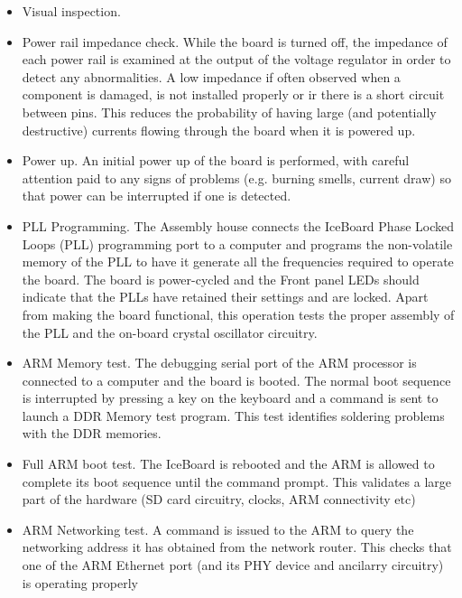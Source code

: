 \documentclass[11pt,article]{memoir}
\begin{document}
\begin{itemize}
	\item Visual inspection.

	\item Power rail impedance check. While the board is turned off, the impedance of
	each power rail is examined at the output of the voltage regulator in order to
	detect any abnormalities. A low impedance if often observed when a component
	is damaged, is not installed properly or ir there is a short circuit between
	pins. This reduces the probability of having large (and potentially
	destructive) currents flowing through the board when it is powered up.

	\item Power up. An initial power up of the board is performed, with careful
	attention paid to any signs of problems (e.g. burning smells, current draw) so
	that power can be interrupted if one is detected.

	\item PLL Programming. The Assembly house connects the IceBoard Phase Locked
	Loops (PLL) programming port to a computer and programs the non-volatile
	memory of the PLL to have it generate all the frequencies required to operate
	the board. The board is power-cycled and the Front panel LEDs should indicate
	that the PLLs have retained their settings and are locked. Apart from making
	the board functional, this operation tests the proper assembly of the PLL and
	the on-board crystal oscillator circuitry.

	\item ARM Memory test. The debugging serial port of the ARM processor is
	connected to a computer and the board is booted. The normal boot sequence
	is interrupted by pressing a key on the keyboard and a command is sent to
	launch a DDR Memory test program. This test identifies soldering problems
	with the DDR memories.

	\item Full ARM boot test. The IceBoard is rebooted and the ARM is allowed
	to complete its boot sequence until the command prompt. This validates a
	large part of the hardware (SD card circuitry, clocks, ARM connectivity
	etc)

	\item ARM Networking test. A command is issued to the ARM to query the
	networking address it has obtained from the network router. This checks
	that one of the ARM Ethernet port (and its PHY device and ancilarry
	circuitry) is operating properly

\end{itemize}
\end{document}
